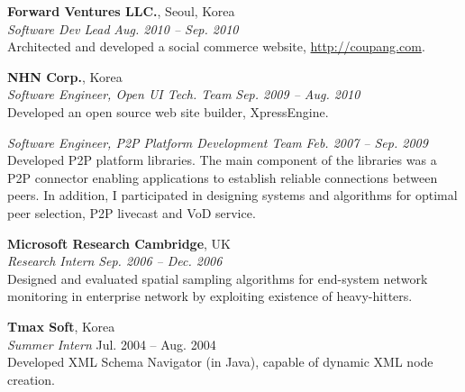 \documentclass[margin,line]{res}
\begin{document}
\begin{resume}
{\bf Forward Ventures LLC.}, Seoul, Korea \\
{\em Software Dev Lead} \hfill {\it Aug. 2010 -- Sep. 2010} \\
Architected and developed a social commerce website,
\url{http://coupang.com}. 

{\bf NHN Corp.}, Korea \\
{\em Software Engineer, Open UI Tech. Team} \hfill {\it Sep. 2009 -- Aug. 2010}\\
Developed an open source web site builder, XpressEngine.

{\em Software Engineer, P2P Platform Development Team} \hfill {\it Feb. 2007 -- Sep. 2009}\\
Developed P2P platform libraries. %
The main component of the libraries was a P2P connector enabling applications to establish reliable connections between peers. 
In addition, I participated in designing systems and algorithms for optimal peer
selection, P2P livecast and VoD service.

{\bf Microsoft Research Cambridge}, UK \\
{\em Research Intern} \hfill {\it Sep. 2006 -- Dec. 2006} \\
Designed and evaluated spatial sampling algorithms for end-system network monitoring in enterprise network by exploiting existence of heavy-hitters. 



{\bf Tmax Soft}, Korea\\
{\em Summer Intern} \hfill {\sc Jul. 2004 -- Aug. 2004}\\
Developed XML Schema Navigator (in Java), capable of dynamic XML node creation.\\


\end{resume}
\end{document}
